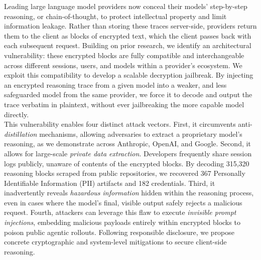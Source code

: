 \noindent
Leading large language model providers now conceal their models' step-by-step reasoning, or chain-of-thought, to protect intellectual property and limit information leakage. Rather than storing these traces server-side, providers return them to the client as blocks of encrypted text, which the client passes back with each subsequent request. Building on prior research, we identify an architectural vulnerability: these encrypted blocks are fully compatible and interchangeable across different sessions, users, and models within a provider's ecosystem. We exploit this compatibility to develop a scalable decryption jailbreak. By injecting an encrypted reasoning trace from a given model into a weaker, and less safeguarded model from the same provider, we force it to decode and output the trace verbatim in plaintext, without ever jailbreaking the more capable model directly. \\

\noindent This vulnerability enables four distinct attack vectors. First, it circumvents anti-\textit{distillation} mechanisms, allowing adversaries to extract a proprietary model's reasoning, as we demonstrate across Anthropic, OpenAI, and Google. Second, it allows for large-scale \textit{private data extraction}. Developers frequently share session logs publicly, unaware of contents of the encrypted blocks. By decoding 315,320 reasoning blocks scraped from public repositories, we recovered 367 Personally Identifiable Information (PII) artifacts and 182 credentials. %
Third, it inadvertently reveals \textit{hazardous information} hidden within the reasoning process, even in cases where the model's final, visible output safely rejects a malicious request. Fourth, attackers can leverage this flaw to execute \textit{invisible prompt injections}, embedding malicious payloads entirely within encrypted blocks to poison public agentic rollouts. Following responsible disclosure, we propose concrete cryptographic and system-level mitigations to secure client-side reasoning. \\


